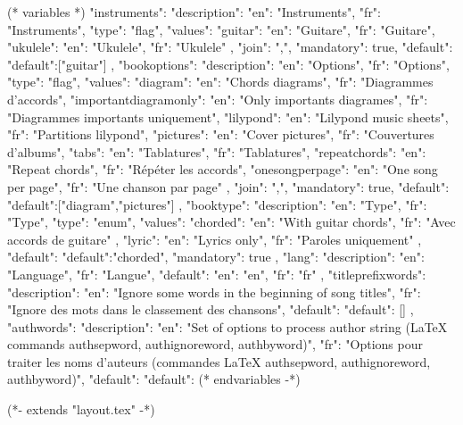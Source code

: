 (* variables *)
{
"instruments": {"description": {"en": "Instruments", "fr": "Instruments"},
               "type": "flag",
               "values": {"guitar": {"en": "Guitare", "fr": "Guitare"},
                          "ukulele": {"en": "Ukulele", "fr": "Ukulele"}
                         },
               "join": ",",
               "mandatory": true,
               "default": {"default":["guitar"]}
            },
"bookoptions": {"description": {"en": "Options", "fr": "Options"},
               "type": "flag",
               "values": {"diagram": {"en": "Chords diagrams", "fr": "Diagrammes d'accords"},
                          "importantdiagramonly": {"en": "Only importants diagrames", "fr": "Diagrammes importants uniquement"},
                          "lilypond": {"en": "Lilypond music sheets", "fr": "Partitions lilypond"},
                          "pictures": {"en": "Cover pictures", "fr": "Couvertures d'albums"},
                          "tabs": {"en": "Tablatures", "fr": "Tablatures"},
                          "repeatchords": {"en": "Repeat chords", "fr": "Répéter les accords"},
                          "onesongperpage": {"en": "One song per page", "fr": "Une chanson par page"}
                       },
               "join": ",",
               "mandatory": true,
               "default": {"default":["diagram","pictures"]}
            },
"booktype": {"description": {"en": "Type", "fr": "Type"},
            "type": "enum",
            "values": {"chorded": {"en": "With guitar chords", "fr": "Avec accords de guitare" },
                                   "lyric": {"en": "Lyrics only", "fr": "Paroles uniquement"}
                     },
            "default": {"default":"chorded"},
            "mandatory": true
            },
"lang": {"description": {"en": "Language", "fr": "Langue"},
         "default": {"en": "en", "fr": "fr"}
      },
"titleprefixwords": {"description": {"en": "Ignore some words in the beginning of song titles",
                                     "fr": "Ignore des mots dans le classement des chansons"},
                     "default": {"default": []}
                     },
"authwords": {"description": {"en": "Set of options to process author string (LaTeX commands authsepword, authignoreword, authbyword)",
                              "fr": "Options pour traiter les noms d'auteurs (commandes LaTeX authsepword, authignoreword, authbyword)"},
               "default": {"default": {}}
               }
}
(* endvariables -*)

(*- extends "layout.tex" -*)

